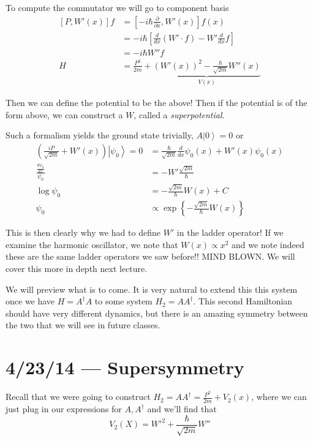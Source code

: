 \documentclass[10pt]{report}
\newcommand{\ket}[1]{\left|#1\right>}
\newcommand{\rd}[2]{\frac{d#1}{d#2}}
\newcommand{\pd}[2]{\frac{\partial #1}{\partial#2}}
\begin{document}
To compute the commutator we will go to component basis
\begin{align}
    \left[ P,W'(x) \right]f &= \left[ -i\hbar \pd{}{x}, W'(x) \right]f(x)\\
    &= -i\hbar\left[ \rd{}{x}(W' \cdot f) - W'\rd{}{x}f \right]\\
    &= -i\hbar W'' f\\
    H &= \frac{P^2}{2m} + \underbrace{\left( W'(x) \right)^2 - \frac{\hbar}{\sqrt{2m}}W''(x)}_{V(x)}
\end{align}

Then we can define the potential to be the above! Then if the potential is of the form above, we can construct a $W$, called a \emph{superpotential}. 

Such a formalism yields the ground state trivially, $A \ket{0} = 0$ or
\begin{align}
    \left(\frac{iP}{\sqrt{2m}} + W'(x)\right) \ket{\psi_0} = 0 &= \frac{\hbar}{\sqrt{2m}}\rd{}{x}\psi_0(x) + W'(x)\psi_0(x)\\
    \frac{\rd{\psi_0}{x}}{\psi_0} &= -W'\frac{\sqrt{2m}}{\hbar}\\
    \log \psi_0 &= -\frac{\sqrt{2m}}{\hbar} W(x) + C\\
    \psi_0 &\propto \exp\left\{ -\frac{\sqrt{2m}}{\hbar}W(x) \right\}
\end{align}

This is then clearly why we had to define $W'$ in the ladder operator! If we examine the harmonic oscillator, we note that $W(x) \propto x^2$ and we note indeed these are the same ladder operators we saw before!! MIND BLOWN. We will cover this more in depth next lecture.

We will preview what is to come. It is very natural to extend this this system once we have $H = A^\dagger A$ to some system $H_2 = AA^\dagger$. This second Hamiltonian should have very different dynamics, but there is an amazing symmetry between the two that we will see in future classes. 
\chapter{4/23/14 --- Supersymmetry}

Recall that we were going to construct $H_2 = AA^\dagger = \frac{P^2}{2m} + V_2(x)$, where we can just plug in our expressions for $A,A^\dagger$ and we'll find that
\begin{equation}
    V_2(X) = W'^2 + \frac{\hbar}{\sqrt{2m}}W''
\end{equation}
\end{document}
